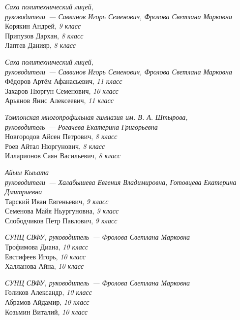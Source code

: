 \begin{description}[style=unboxed, labelwidth=\linewidth, font=\bfseries, listparindent=0pt, leftmargin=15pt, parsep=0pt]
\item[Бо Сины]
\textit{Саха политехнический лицей, \\
руководители~— Саввинов Игорь Семенович, Фролова Светлана Марковна} \\
Корякин Андрей, \textit{9 класс} \\
Припузов Дархан, \textit{8 класс} \\
Лаптев Данияр, \textit{8 класс}

\item[ЗФЯ]
\textit{Саха политехнический лицей, \\
руководители~— Саввинов Игорь Семенович, Фролова Светлана Марковна} \\
Фёдоров Артём Афанасьевич, \textit{11 класс} \\
Захаров Нюргун Семенович, \textit{10 класс} \\
Арьянов Янис Алексеевич, \textit{11 класс}

\item[Саайса]
\textit{Томпонская многопрофильная гимназия им. В. А. Штырова, \\
руководитель~— Рогачева Екатерина Григорьевна} \\
Новгородов Айсен Петрович, \textit{8 класс} \\
Роев Айтал Нюргунович, \textit{8 класс} \\
Илларионов Саян Васильевич, \textit{8 класс}

\item[Сигмы]
\textit{Айыы Кыьата \\
руководители~— Халабышева Евгения Владимировна, Готовцева Екатерина Дмитриевна} \\
Тарский Иван Евгеньевич, \textit{9 класс} \\
Семенова Майя Ньургуновна, \textit{9 класс} \\
Слободчиков Петр Павлович, \textit{9 класс}

\item[СУНЦ-1]
\textit{СУНЦ СВФУ, руководитель~— Фролова Светлана Марковна} \\
Трофимова Диана, \textit{10 класс} \\
Евстифеев Игорь, \textit{10 класс} \\
Халланова Айна, \textit{10 класс}

\item[СУНЦ-2]
\textit{СУНЦ СВФУ, руководитель~— Фролова Светлана Марковна} \\
Голиков Александр, \textit{10 класс} \\
Абрамов Айдамир, \textit{10 класс} \\
Козьмин Виталий, \textit{10 класс}


\end{description}
